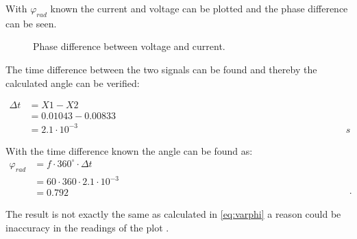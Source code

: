 With $\varphi_{rad}$ known the current and voltage can be plotted and the phase difference can be seen.

\begin{figure}[H]
\centering

\caption{Phase difference between voltage and current.}
\label{fig:phase_difference_current_voltage}
\end{figure}

The time difference between the two signals can be found and thereby the calculated angle can be verified:

\begin{align}
\Delta t &= X1 - X2 \\ \nonumber
			  &= 0.01043 - 0.00833 \\ \nonumber
	 		  &= 2.1 \cdot 10^{-3} & & & & & & & & & & & & & & & & & & & & & & & & & & & & & & \unit{s}
\end{align}

With the time difference known the angle can be found as:
\begin{align}
 \varphi_{rad}&= f \cdot 360^{\circ} \cdot \Delta t \\ \nonumber
			  &= 60 \cdot 360 \cdot 2.1 \cdot 10^{-3}  \\ \nonumber
	 		  &= 0.792 & & & & & & & & & & & & & & & & & & & & & & & & & & & & & & \unit{\cdot}
\end{align}

The result is not exactly the same as calculated in \eqref{eq:varphi} a reason could be inaccuracy in the readings of the plot . 

